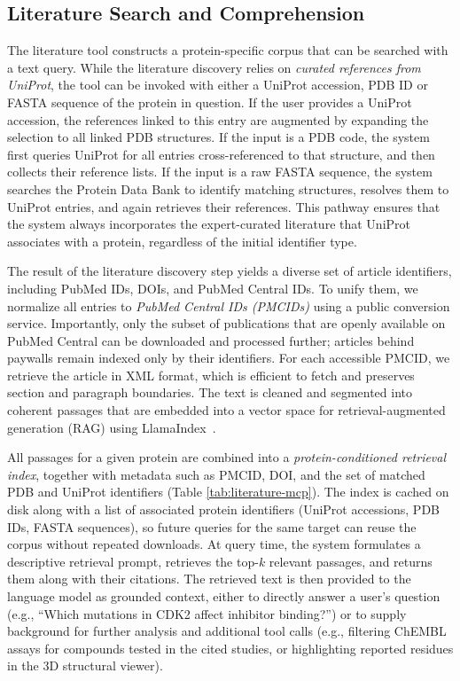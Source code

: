 \documentclass{article}
\begin{document}
\subsection{Literature Search and Comprehension}\label{sec:data:literature}
The literature tool constructs a protein-specific corpus that can be searched with a text query. While the literature discovery relies on \emph{curated references from UniProt}, the tool can be invoked with either a UniProt accession, PDB ID or FASTA sequence of the protein in question. If the user provides a UniProt accession, the references linked to this entry are augmented by expanding the selection to all linked PDB structures. If the input is a PDB code, the system first queries UniProt for all entries cross-referenced to that structure, and then collects their reference lists. If the input is a raw FASTA sequence, the system searches the Protein Data Bank to identify matching structures, resolves them to UniProt entries, and again retrieves their references. This pathway ensures that the system always incorporates the expert-curated literature that UniProt associates with a protein, regardless of the initial identifier type.

The result of the literature discovery step yields a diverse set of article identifiers, including PubMed IDs, DOIs, and PubMed Central IDs. To unify them, we normalize all entries to \emph{PubMed Central IDs (PMCIDs)} using a public conversion service. Importantly, only the subset of publications that are openly available on PubMed Central can be downloaded and processed further; articles behind paywalls remain indexed only by their identifiers. For each accessible PMCID, we retrieve the article in XML format, which is efficient to fetch and preserves section and paragraph boundaries. The text is cleaned and segmented into coherent passages that are embedded into a vector space for retrieval-augmented generation (RAG) using LlamaIndex~\citep{Liu_LlamaIndex_2022}.

All passages for a given protein are combined into a \emph{protein-conditioned retrieval index}, together with metadata such as PMCID, DOI, and the set of matched PDB and UniProt identifiers (Table \ref{tab:literature-mcp}). The index is cached on disk along with a list of associated protein identifiers (UniProt accessions, PDB IDs, FASTA sequences), so future queries for the same target can reuse the corpus without repeated downloads. At query time, the system formulates a descriptive retrieval prompt, retrieves the top-$k$ relevant passages, and returns them along with their citations. The retrieved text is then provided to the language model as grounded context, either to directly answer a user’s question (e.g., “Which mutations in CDK2 affect inhibitor binding?”) or to supply background for further analysis and additional tool calls (e.g., filtering ChEMBL assays for compounds tested in the cited studies, or highlighting reported residues in the 3D structural viewer).
\end{document}
